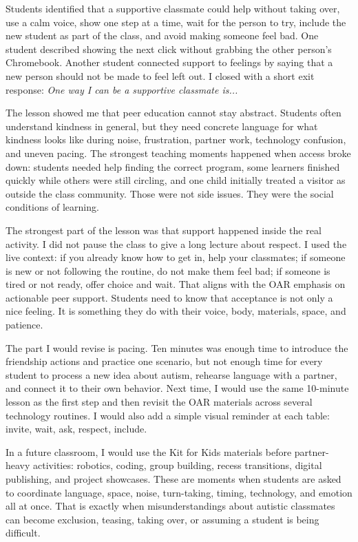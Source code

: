 \documentclass[11pt]{article}
\newcommand{\reviewsection}[1]{\vspace{0.08in}\noindent{\normalsize\bfseries\color{PrimaryRed}#1}\par\vspace{0.02in}}
\begin{document}
Students identified that a supportive classmate could help without taking over, use a calm voice, show one step at a time, wait for the person to try, include the new student as part of the class, and avoid making someone feel bad. One student described showing the next click without grabbing the other person's Chromebook. Another student connected support to feelings by saying that a new person should not be made to feel left out. I closed with a short exit response: \textit{One way I can be a supportive classmate is...}

\reviewsection{Reflection on the Lesson}

The lesson showed me that peer education cannot stay abstract. Students often understand kindness in general, but they need concrete language for what kindness looks like during noise, frustration, partner work, technology confusion, and uneven pacing. The strongest teaching moments happened when access broke down: students needed help finding the correct program, some learners finished quickly while others were still circling, and one child initially treated a visitor as outside the class community. Those were not side issues. They were the social conditions of learning.

The strongest part of the lesson was that support happened inside the real activity. I did not pause the class to give a long lecture about respect. I used the live context: if you already know how to get in, help your classmates; if someone is new or not following the routine, do not make them feel bad; if someone is tired or not ready, offer choice and wait. That aligns with the OAR emphasis on actionable peer support. Students need to know that acceptance is not only a nice feeling. It is something they do with their voice, body, materials, space, and patience.

The part I would revise is pacing. Ten minutes was enough time to introduce the friendship actions and practice one scenario, but not enough time for every student to process a new idea about autism, rehearse language with a partner, and connect it to their own behavior. Next time, I would use the same 10-minute lesson as the first step and then revisit the OAR materials across several technology routines. I would also add a simple visual reminder at each table: invite, wait, ask, respect, include.

\reviewsection{Future Classroom Incorporation}

In a future classroom, I would use the Kit for Kids materials before partner-heavy activities: robotics, coding, group building, recess transitions, digital publishing, and project showcases. These are moments when students are asked to coordinate language, space, noise, turn-taking, timing, technology, and emotion all at once. That is exactly when misunderstandings about autistic classmates can become exclusion, teasing, taking over, or assuming a student is being difficult.
\end{document}
